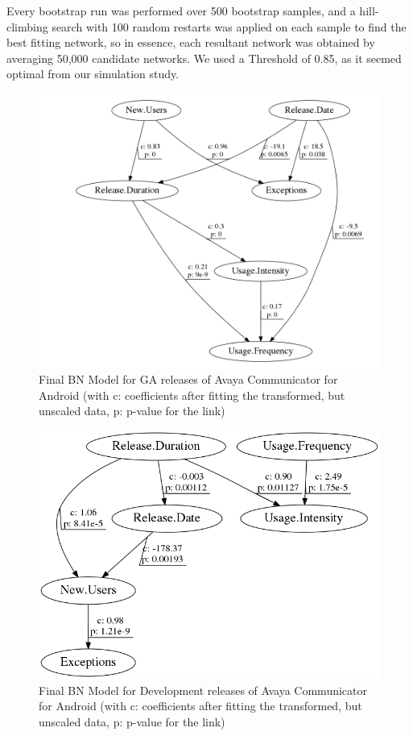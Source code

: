 \documentclass[smallextended]{svjour3}       %
\begin{document}
Every bootstrap run was performed over 500 bootstrap samples, and a
hill-climbing search  with 100 random restarts was applied on each sample 
to find the best fitting network, so in essence, each resultant network was 
obtained by averaging 50,000 candidate networks. We used a Threshold of 0.85, as it seemed optimal from our simulation study.

\begin{figure}[!t]
\centering
\includegraphics[width=0.7\linewidth]{AGA}%
\caption{Final BN Model for GA releases of Avaya Communicator for Android (with c: coefficients after fitting the transformed, but unscaled data, p: p-value  for the link) }
\label{fig:finalAGA}
\vspace{-10pt}
\end{figure}

\begin{figure}[!t]
\centering
\includegraphics[width=0.7\linewidth]{AD}%
\caption{Final BN Model for Development releases of Avaya Communicator for Android (with c: coefficients after fitting the transformed, but unscaled data, p: p-value  for the link) }
\label{fig:finalAD}
\vspace{-10pt}
\end{figure}
\end{document}
